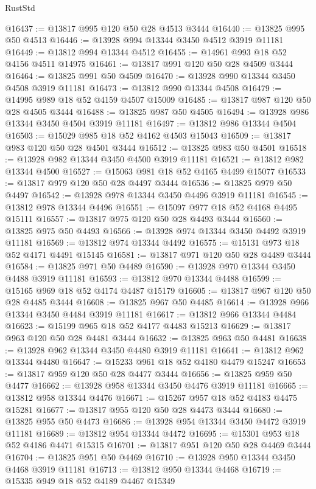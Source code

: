 \begin{lexlean}{RustStd}
\begin{coremodule}
@16437 := @13817 @995 @120 @50 @28 @4513 @3444
@16440 := @13825 @995 @50 @4513
@16446 := @13928 @994 @13344 @3450 @4512 @3919 @11181
@16449 := @13812 @994 @13344 @4512
@16455 := @14961 @993 @18 @52 @4156 @4511 @14975
@16461 := @13817 @991 @120 @50 @28 @4509 @3444
@16464 := @13825 @991 @50 @4509
@16470 := @13928 @990 @13344 @3450 @4508 @3919 @11181
@16473 := @13812 @990 @13344 @4508
@16479 := @14995 @989 @18 @52 @4159 @4507 @15009
@16485 := @13817 @987 @120 @50 @28 @4505 @3444
@16488 := @13825 @987 @50 @4505
@16494 := @13928 @986 @13344 @3450 @4504 @3919 @11181
@16497 := @13812 @986 @13344 @4504
@16503 := @15029 @985 @18 @52 @4162 @4503 @15043
@16509 := @13817 @983 @120 @50 @28 @4501 @3444
@16512 := @13825 @983 @50 @4501
@16518 := @13928 @982 @13344 @3450 @4500 @3919 @11181
@16521 := @13812 @982 @13344 @4500
@16527 := @15063 @981 @18 @52 @4165 @4499 @15077
@16533 := @13817 @979 @120 @50 @28 @4497 @3444
@16536 := @13825 @979 @50 @4497
@16542 := @13928 @978 @13344 @3450 @4496 @3919 @11181
@16545 := @13812 @978 @13344 @4496
@16551 := @15097 @977 @18 @52 @4168 @4495 @15111
@16557 := @13817 @975 @120 @50 @28 @4493 @3444
@16560 := @13825 @975 @50 @4493
@16566 := @13928 @974 @13344 @3450 @4492 @3919 @11181
@16569 := @13812 @974 @13344 @4492
@16575 := @15131 @973 @18 @52 @4171 @4491 @15145
@16581 := @13817 @971 @120 @50 @28 @4489 @3444
@16584 := @13825 @971 @50 @4489
@16590 := @13928 @970 @13344 @3450 @4488 @3919 @11181
@16593 := @13812 @970 @13344 @4488
@16599 := @15165 @969 @18 @52 @4174 @4487 @15179
@16605 := @13817 @967 @120 @50 @28 @4485 @3444
@16608 := @13825 @967 @50 @4485
@16614 := @13928 @966 @13344 @3450 @4484 @3919 @11181
@16617 := @13812 @966 @13344 @4484
@16623 := @15199 @965 @18 @52 @4177 @4483 @15213
@16629 := @13817 @963 @120 @50 @28 @4481 @3444
@16632 := @13825 @963 @50 @4481
@16638 := @13928 @962 @13344 @3450 @4480 @3919 @11181
@16641 := @13812 @962 @13344 @4480
@16647 := @15233 @961 @18 @52 @4180 @4479 @15247
@16653 := @13817 @959 @120 @50 @28 @4477 @3444
@16656 := @13825 @959 @50 @4477
@16662 := @13928 @958 @13344 @3450 @4476 @3919 @11181
@16665 := @13812 @958 @13344 @4476
@16671 := @15267 @957 @18 @52 @4183 @4475 @15281
@16677 := @13817 @955 @120 @50 @28 @4473 @3444
@16680 := @13825 @955 @50 @4473
@16686 := @13928 @954 @13344 @3450 @4472 @3919 @11181
@16689 := @13812 @954 @13344 @4472
@16695 := @15301 @953 @18 @52 @4186 @4471 @15315
@16701 := @13817 @951 @120 @50 @28 @4469 @3444
@16704 := @13825 @951 @50 @4469
@16710 := @13928 @950 @13344 @3450 @4468 @3919 @11181
@16713 := @13812 @950 @13344 @4468
@16719 := @15335 @949 @18 @52 @4189 @4467 @15349

\end{coremodule}
\end{lexlean}
